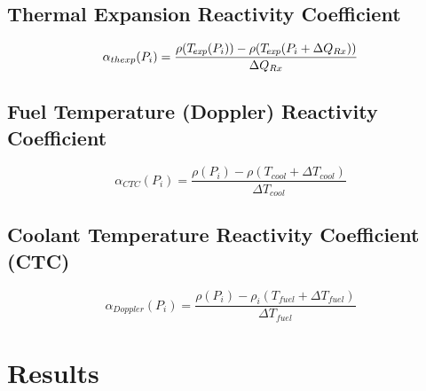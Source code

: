   \subsection{Thermal Expansion Reactivity Coefficient}
  \begin{equation}
    \label{eq:thermal_expansion_reactivity_coefficient}
    \alpha_{thexp}(P_i) = \frac{\rho({T_{\!\mbox{\scriptsize \em exp}}}(P_i)) - 
      \rho({T_{\!\mbox{\scriptsize \em exp}}}(P_i + \Delta Q_{Rx}))}
      {\Delta Q_{Rx}}
  \end{equation}

  \subsection{Fuel Temperature (Doppler) Reactivity Coefficient}
  \begin{equation}
    \label{eq:doppler_reactivity_coefficient}
    \alpha_{CTC}(P_i) = \frac{\rho(P_i) - \rho(T_{cool}+\Delta T_{cool})}
      {\Delta T_{cool}}
  \end{equation}

  \subsection{Coolant Temperature Reactivity Coefficient (CTC)}
  \begin{equation}
    \label{eq:coolant_temperature_reactivity_coefficient}
    \alpha_{Doppler}(P_i) = \frac{\rho(P_i) - \rho_i(T_{fuel}+\Delta T_{fuel})}
      {\Delta T_{fuel}}
  \end{equation}


\section{Results}
\label{sec:results}

  \begin{figure}
    \centering
    \hspace*{\fill}
    \vspace{\baselineskip}
    \hspace*{\fill}
  \end{figure}

